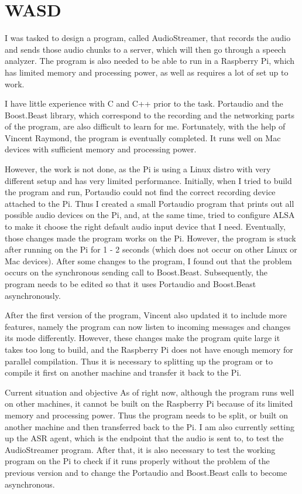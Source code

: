 \section{WASD}

I was tasked to design a program, called AudioStreamer, that records the audio and sends those audio chunks to a server, which will then go through a speech analyzer. The program is also needed to be able to run in a Raspberry Pi, which has limited memory and processing power, as well as requires a lot of set up to work.

I have little experience with C and C++ prior to the task. Portaudio and the Boost.Beast library, which correspond to the recording and the networking parts of the program, are also difficult to learn for me. Fortunately, with the help of Vincent Raymond, the program is eventually completed. It runs well on Mac devices with sufficient memory and processing power.

However, the work is not done, as the Pi is using a Linux distro with very different setup and has very limited performance. Initially, when I tried to build the program and run, Portaudio could not find the correct recording device attached to the Pi. Thus I created a small Portaudio program that prints out all possible audio devices on the Pi, and, at the same time, tried to configure ALSA to make it choose the right default audio input device that I need. Eventually, those changes made the program works on the Pi. However, the program is stuck after running on the Pi for 1 - 2 seconds (which does not occur on other Linux or Mac devices). After some changes to the program, I found out that the problem occurs on the synchronous sending call to Boost.Beast. Subsequently, the program needs to be edited so that it uses Portaudio and Boost.Beast asynchronously.

After the first version of the program, Vincent also updated it to include more features, namely the program can now listen to incoming messages and changes its mode differently. However, these changes make the program quite large it takes too long to build, and the Raspberry Pi does not have enough memory for parallel compilation. Thus it is necessary to splitting up the program or to compile it first on another machine and transfer it back to the Pi.

Current situation and objective
As of right now, although the program runs well on other machines, it cannot be built on the Raspberry Pi because of its limited memory and processing power. Thus the program needs to be split, or built on another machine and then transferred back to the Pi. I am also currently setting up the ASR agent, which is the endpoint that the audio is sent to, to test the AudioStreamer program. After that, it is also necessary to test the working program on the Pi to check if it runs properly without the problem of the previous version and to change the Portaudio and Boost.Beast calls to become asynchronous.
